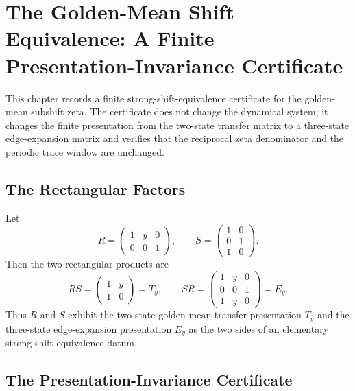\chapter{The Golden-Mean Shift Equivalence: A Finite Presentation-Invariance Certificate}
\label{ch:concrete-instances-window6-golden-mean-shift-equivalence}

This chapter records a finite strong-shift-equivalence certificate for the golden-mean subshift zeta. The certificate does not change the dynamical system; it changes the finite presentation from the two-state transfer matrix to a three-state edge-expansion matrix and verifies that the reciprocal zeta denominator and the periodic trace window are unchanged.

\section{The Rectangular Factors}
\label{sec:window6-golden-mean-shift-equivalence-factors}

Let
$$
R=\begin{pmatrix}
1&y&0\\
0&0&1
\end{pmatrix},
\qquad
S=\begin{pmatrix}
1&0\\
0&1\\
1&0
\end{pmatrix}.
$$
Then the two rectangular products are
$$
RS=
\begin{pmatrix}
1&y\\
1&0
\end{pmatrix}
=T_y,
\qquad
SR=
\begin{pmatrix}
1&y&0\\
0&0&1\\
1&y&0
\end{pmatrix}
=E_y.
$$
Thus $R$ and $S$ exhibit the two-state golden-mean transfer presentation $T_y$ and the three-state edge-expansion presentation $E_y$ as the two sides of an elementary strong-shift-equivalence datum.

\section{The Presentation-Invariance Certificate}
\label{sec:window6-golden-mean-shift-equivalence-certificate}

